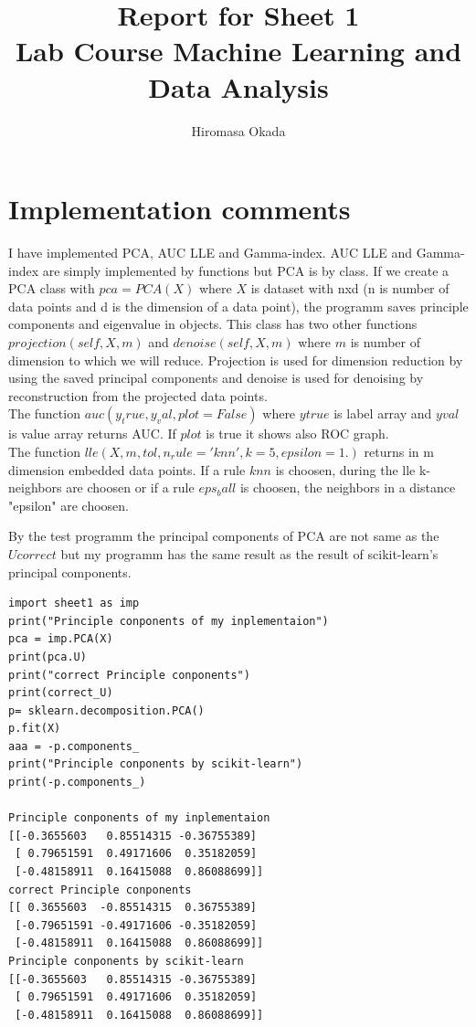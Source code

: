 \documentclass[a4paper,11pt]{article}
\begin{document}
\author{Hiromasa Okada}
\title{\vspace{-2cm}Report for Sheet 1\\
\small{Lab Course Machine Learning and Data Analysis}}
\maketitle
\section*{Implementation comments}

I have implemented PCA, AUC LLE and Gamma-index. AUC LLE and Gamma-index are simply implemented by functions but PCA is by class. If we create a PCA class with $pca = PCA(X)$ where $X$ is dataset with nxd (n is number of data points and d is the dimension of a data point), the programm saves  principle components and eigenvalue in objects. This class has two other functions $projection(self, X, m)$ and $denoise(self, X, m)$ where $m$ is number of dimension to which we will reduce. Projection is used for dimension reduction by using the saved principal components and denoise is used for denoising by reconstruction from the projected data points. \\
The function $auc(y_true, y_val, plot=False)$ where $ytrue$ is label array and $yval$ is value array returns AUC. If $plot$ is true it shows also ROC graph. \\
The function $lle(X, m, tol, n_rule='knn', k=5, epsilon=1.)$ returns in m dimension embedded data points. If a rule $knn$ is choosen, during the lle k-neighbors are choosen or if a rule $eps_ball$ is choosen, the neighbors in a distance "epsilon" are choosen.

By the test programm the principal components of PCA are not same as the $Ucorrect$ but my programm has the same result as the result of scikit-learn's principal components.

\begin{verbatim}
import sheet1 as imp
print("Principle conponents of my inplementaion")
pca = imp.PCA(X)
print(pca.U)
print("correct Principle conponents")
print(correct_U)
p= sklearn.decomposition.PCA()
p.fit(X)
aaa = -p.components_
print("Principle conponents by scikit-learn")
print(-p.components_)

Principle conponents of my inplementaion
[[-0.3655603   0.85514315 -0.36755389]
 [ 0.79651591  0.49171606  0.35182059]
 [-0.48158911  0.16415088  0.86088699]]
correct Principle conponents
[[ 0.3655603  -0.85514315  0.36755389]
 [-0.79651591 -0.49171606 -0.35182059]
 [-0.48158911  0.16415088  0.86088699]]
Principle conponents by scikit-learn
[[-0.3655603   0.85514315 -0.36755389]
 [ 0.79651591  0.49171606  0.35182059]
 [-0.48158911  0.16415088  0.86088699]]
\end{verbatim}
\end{document}
